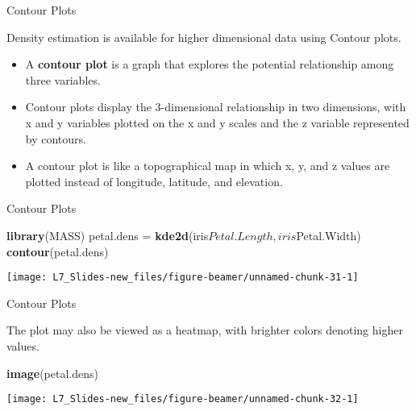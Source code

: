 \documentclass[ignorenonframetext,]{beamer}
\newenvironment{Shaded}{\begin{snugshade}}{\end{snugshade}}
\newcommand{\KeywordTok}[1]{\textcolor[rgb]{0.13,0.29,0.53}{\textbf{{#1}}}}
\newcommand{\StringTok}[1]{\textcolor[rgb]{0.31,0.60,0.02}{{#1}}}
\newcommand{\NormalTok}[1]{{#1}}
\begin{document}
\begin{frame}{Contour Plots}

Density estimation is available for higher dimensional data using
Contour plots.

\begin{itemize}
\item
  A \textbf{contour plot} is a graph that explores the potential
  relationship among three variables.
\item
  Contour plots display the 3-dimensional relationship in two
  dimensions, with x and y variables plotted on the x and y scales and
  the z variable represented by contours.
\item
  A contour plot is like a topographical map in which x, y, and z values
  are plotted instead of longitude, latitude, and elevation.
\end{itemize}

\end{frame}

\begin{frame}[fragile]{Contour Plots}

\small

\begin{Shaded}
\begin{Highlighting}[]
\KeywordTok{library}\NormalTok{(MASS)}
\NormalTok{petal.dens =}\StringTok{ }\KeywordTok{kde2d}\NormalTok{(iris$Petal.Length, iris$Petal.Width)}
\KeywordTok{contour}\NormalTok{(petal.dens)}
\end{Highlighting}
\end{Shaded}

\begin{center}\texttt{[image: L7\_Slides-new\_files/figure-beamer/unnamed-chunk-31-1]} \end{center}

\end{frame}

\begin{frame}[fragile]{Contour Plots}

The plot may also be viewed as a heatmap, with brighter colors denoting
higher values. \small

\begin{Shaded}
\begin{Highlighting}[]
\KeywordTok{image}\NormalTok{(petal.dens)}
\end{Highlighting}
\end{Shaded}

\begin{center}\texttt{[image: L7\_Slides-new\_files/figure-beamer/unnamed-chunk-32-1]} \end{center}

\end{frame}
\end{document}

